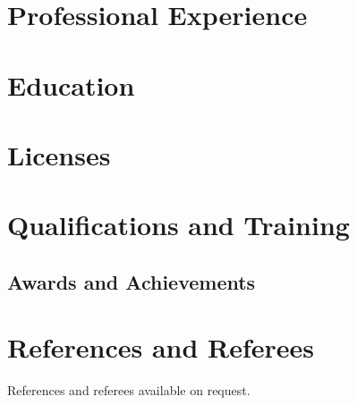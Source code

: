 \documentclass[10pt]{article}
\begin{document}
\section*{Professional Experience}


\section*{Education}


\section*{Licenses}


\section*{Qualifications and Training}


\subsection*{Awards and Achievements}


\section*{References and Referees}
References and referees available on request.
\end{document}
